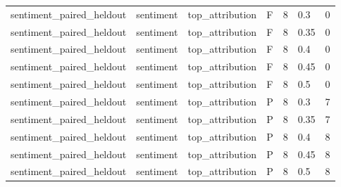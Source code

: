 \begin{tabular}{lllllll}
sentiment\_paired\_heldout & sentiment & top\_attribution & F & 8 & 0.3 & 0 \\
sentiment\_paired\_heldout & sentiment & top\_attribution & F & 8 & 0.35 & 0 \\
sentiment\_paired\_heldout & sentiment & top\_attribution & F & 8 & 0.4 & 0 \\
sentiment\_paired\_heldout & sentiment & top\_attribution & F & 8 & 0.45 & 0 \\
sentiment\_paired\_heldout & sentiment & top\_attribution & F & 8 & 0.5 & 0 \\
sentiment\_paired\_heldout & sentiment & top\_attribution & P & 8 & 0.3 & 7 \\
sentiment\_paired\_heldout & sentiment & top\_attribution & P & 8 & 0.35 & 7 \\
sentiment\_paired\_heldout & sentiment & top\_attribution & P & 8 & 0.4 & 8 \\
sentiment\_paired\_heldout & sentiment & top\_attribution & P & 8 & 0.45 & 8 \\
sentiment\_paired\_heldout & sentiment & top\_attribution & P & 8 & 0.5 & 8 \\
\bottomrule
\end{tabular}
